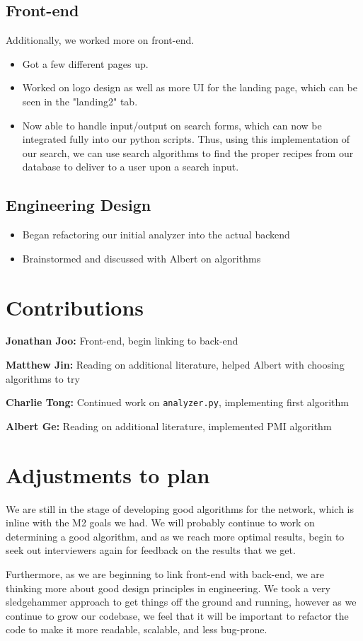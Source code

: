 \documentclass{article}
\begin{document}
\subsection{Front-end}
Additionally, we
worked more on front-end.
\begin{itemize}
    \item Got a few different pages up. 
    \item Worked on logo design as well as more UI for the landing page, which can be seen in the "landing2" tab. 
    \item Now able to handle input/output on search forms, which can now be integrated fully into our
python scripts. Thus, using this implementation of our search, we can use search algorithms to find the proper
recipes from our database to deliver to a user upon a search input. 
\end{itemize}

\subsection{Engineering Design}

\begin{itemize}
    \item
Began refactoring our initial analyzer into the actual backend
    \item Brainstormed and discussed with Albert on algorithms
\end{itemize}

\section{Contributions}
\textbf{Jonathan Joo:} Front-end, begin linking to back-end

\textbf{Matthew Jin:} Reading on additional literature, helped Albert with 
    choosing algorithms to try

\textbf{Charlie Tong:} Continued work on \texttt{analyzer.py}, implementing
    first algorithm 

\textbf{Albert Ge:} Reading on additional literature, implemented PMI algorithm



\section{Adjustments to plan}

We are still in the stage of developing good algorithms for the network,
which is inline with the M2 goals we had. We will probably continue
to work on determining a good algorithm, and as we reach more
optimal results, begin to seek out interviewers again for 
feedback on the results that we get.

Furthermore, as we are beginning to link front-end with back-end,
we are thinking more about good design principles in engineering.
We took a very sledgehammer approach to get things off the ground and running,
however
as we continue to grow our codebase, we feel that it will be important
to refactor the code to make it more readable, scalable, and less bug-prone.
\end{document}

